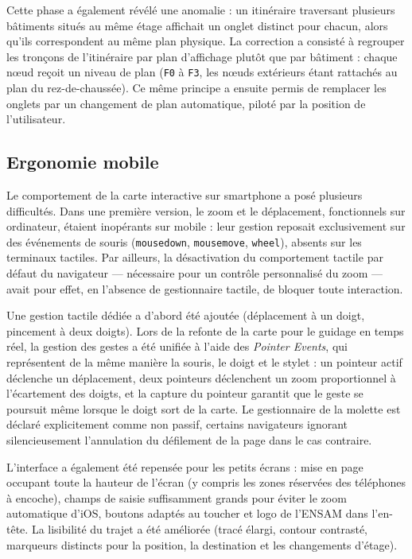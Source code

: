 \documentclass[12pt,a4paper]{report}
\begin{document}
Cette phase a également révélé une anomalie : un itinéraire traversant plusieurs bâtiments situés
au même étage affichait un onglet distinct pour chacun, alors qu'ils correspondent au même plan
physique. La correction a consisté à regrouper les tronçons de l'itinéraire par plan d'affichage
plutôt que par bâtiment : chaque nœud reçoit un niveau de plan (\texttt{F0} à \texttt{F3}, les
nœuds extérieurs étant rattachés au plan du rez-de-chaussée). Ce même principe a ensuite permis de
remplacer les onglets par un changement de plan automatique, piloté par la position de
l'utilisateur.

\subsection{Ergonomie mobile}

Le comportement de la carte interactive sur smartphone a posé plusieurs difficultés. Dans une
première version, le zoom et le déplacement, fonctionnels sur ordinateur, étaient inopérants sur
mobile : leur gestion reposait exclusivement sur des événements de souris (\texttt{mousedown},
\texttt{mousemove}, \texttt{wheel}), absents sur les terminaux tactiles. Par ailleurs, la
désactivation du comportement tactile par défaut du navigateur — nécessaire pour un contrôle
personnalisé du zoom — avait pour effet, en l'absence de gestionnaire tactile, de bloquer toute
interaction.

Une gestion tactile dédiée a d'abord été ajoutée (déplacement à un doigt, pincement à deux doigts).
Lors de la refonte de la carte pour le guidage en temps réel, la gestion des gestes a été unifiée à
l'aide des \emph{Pointer Events}, qui représentent de la même manière la souris, le doigt et le
stylet : un pointeur actif déclenche un déplacement, deux pointeurs déclenchent un zoom
proportionnel à l'écartement des doigts, et la capture du pointeur garantit que le geste se
poursuit même lorsque le doigt sort de la carte. Le gestionnaire de la molette est déclaré
explicitement comme non passif, certains navigateurs ignorant silencieusement l'annulation du
défilement de la page dans le cas contraire.

L'interface a également été repensée pour les petits écrans : mise en page occupant toute la
hauteur de l'écran (y compris les zones réservées des téléphones à encoche), champs de saisie
suffisamment grands pour éviter le zoom automatique d'iOS, boutons adaptés au toucher et logo de
l'ENSAM dans l'en-tête. La lisibilité du trajet a été améliorée (tracé élargi, contour contrasté,
marqueurs distincts pour la position, la destination et les changements d'étage).
\end{document}
